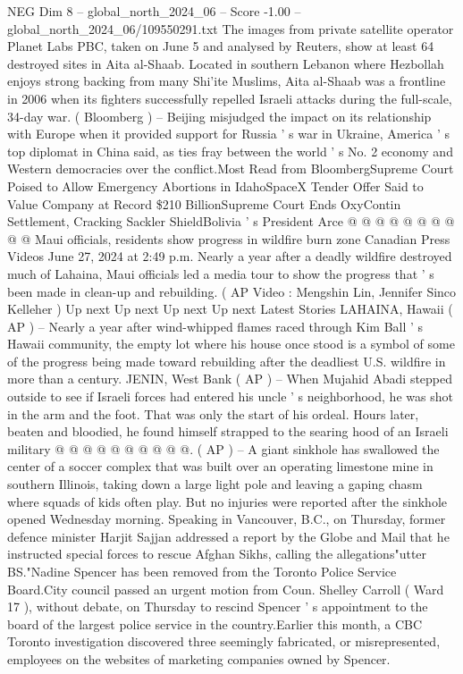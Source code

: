 \begin{textsample}{NEG Dim 8 – global\_north\_2024\_06 – Score -1.00 – global\_north\_2024\_06/109550291.txt}
The images from private satellite operator Planet Labs PBC, taken on June 5 and analysed by Reuters, show at least 64 destroyed sites in Aita al-Shaab.
Located in southern Lebanon where Hezbollah enjoys strong backing from many Shi'ite Muslims, Aita al-Shaab was a frontline in 2006 when its fighters successfully repelled Israeli attacks during the full-scale, 34-day war. ( Bloomberg ) -- Beijing misjudged the impact on its relationship with Europe when it provided support for Russia ' s war in Ukraine, America ' s top diplomat in China said, as ties fray between the world ' s No. 2 economy and Western democracies over the conflict.Most Read from BloombergSupreme Court Poised to Allow Emergency Abortions in IdahoSpaceX Tender Offer Said to Value Company at Record \$210 BillionSupreme Court Ends OxyContin Settlement, Cracking Sackler ShieldBolivia ' s President Arce @ @ @ @ @ @ @ @ @ @ Maui officials, residents show progress in wildfire burn zone Canadian Press Videos June 27, 2024 at 2:49 p.m.
Nearly a year after a deadly wildfire destroyed much of Lahaina, Maui officials led a media tour to show the progress that ' s been made in clean-up and rebuilding. ( AP Video : Mengshin Lin, Jennifer Sinco Kelleher ) Up next Up next Up next Up next Latest Stories LAHAINA, Hawaii ( AP ) -- Nearly a year after wind-whipped flames raced through Kim Ball ' s Hawaii community, the empty lot where his house once stood is a symbol of some of the progress being made toward rebuilding after the deadliest U.S. wildfire in more than a century.
JENIN, West Bank ( AP ) -- When Mujahid Abadi stepped outside to see if Israeli forces had entered his uncle ' s neighborhood, he was shot in the arm and the foot.
That was only the start of his ordeal.
Hours later, beaten and bloodied, he found himself strapped to the searing hood of an Israeli military @ @ @ @ @ @ @ @ @ @. ( AP ) -- A giant sinkhole has swallowed the center of a soccer complex that was built over an operating limestone mine in southern Illinois, taking down a large light pole and leaving a gaping chasm where squads of kids often play.
But no injuries were reported after the sinkhole opened Wednesday morning.
Speaking in Vancouver, B.C., on Thursday, former defence minister Harjit Sajjan addressed a report by the Globe and Mail that he instructed special forces to rescue Afghan Sikhs, calling the allegations"utter BS."Nadine Spencer has been removed from the Toronto Police Service Board.City council passed an urgent motion from Coun.
Shelley Carroll ( Ward 17 ), without debate, on Thursday to rescind Spencer ' s appointment to the board of the largest police service in the country.Earlier this month, a CBC Toronto investigation discovered three seemingly fabricated, or misrepresented, employees on the websites of marketing companies owned by Spencer.

\end{textsample}
